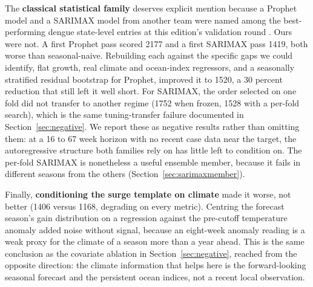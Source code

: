 \documentclass[11pt]{article}
\begin{document}
The \textbf{classical statistical family} deserves explicit mention because a Prophet model and a
SARIMAX model from another team were named among the best-performing dengue state-level entries at
this edition's validation round \citep{imdc2026webinar}. Ours were not. A first
Prophet pass scored 2177 and a first SARIMAX pass 1419, both worse than seasonal-naive. Rebuilding
each against the specific gaps we could identify, flat growth, real climate and ocean-index
regressors, and a seasonally stratified residual bootstrap for Prophet, improved it to 1520, a 30
percent reduction that still left it well short. For SARIMAX, the order selected on one fold did
not transfer to another regime (1752 when frozen, 1528 with a per-fold search), which is the same
tuning-transfer failure documented in Section~\ref{sec:negative}. We report these as negative
results rather than omitting them: at a 16 to 67 week horizon with no recent case data near the
target, the autoregressive structure both families rely on has little left to condition on. The
per-fold SARIMAX is nonetheless a useful ensemble member, because it fails in different seasons
from the others (Section~\ref{sec:sarimaxmember}).

Finally, \textbf{conditioning the surge template on climate} made it worse, not better (1406 versus
1168, degrading on every metric). Centring the forecast season's gain distribution on a regression
against the pre-cutoff temperature anomaly added noise without signal, because an eight-week
anomaly reading is a weak proxy for the climate of a season more than a year ahead. This is the
same conclusion as the covariate ablation in Section~\ref{sec:negative}, reached from the opposite
direction: the climate information that helps here is the forward-looking seasonal forecast and the
persistent ocean indices, not a recent local observation.
\end{document}
